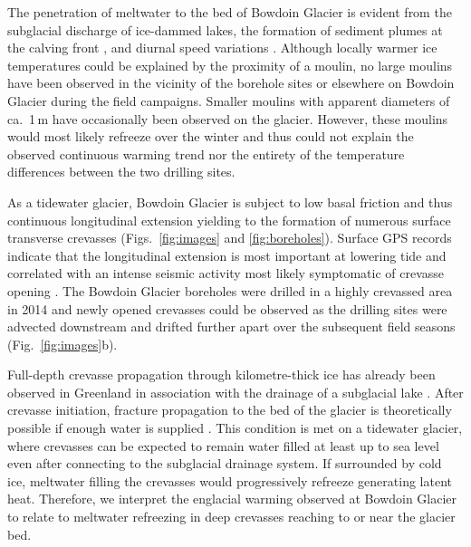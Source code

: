 \documentclass[utf8]{article}
\begin{document}
    The penetration of meltwater to the bed of Bowdoin Glacier is evident from
    the subglacial discharge of ice-dammed lakes, the formation of sediment
    plumes at the calving front \citep{Jouvet.etal.2018, Kanna.etal.2018}, and
    diurnal speed variations \citep{Sugiyama.etal.2014, Podolskiy.etal.2016}.
    Although locally warmer ice temperatures could be explained by the
    proximity of a moulin, no large moulins have been observed in the vicinity
    of the borehole sites or elsewhere on Bowdoin Glacier during the field
    campaigns. Smaller moulins with apparent diameters of ca.~1\,m have
    occasionally been observed on the glacier. However, these moulins would
    most likely refreeze over the winter and thus could not explain the
    observed continuous warming trend nor the entirety of the temperature
    differences between the two drilling sites.

    As a tidewater glacier, Bowdoin Glacier is subject to low basal friction
    \citep{Seddik.etal.2019} and
    thus continuous longitudinal extension yielding to the formation of
    numerous surface transverse crevasses (Figs.~\ref{fig:images} and
    \ref{fig:boreholes}). Surface GPS records indicate that the longitudinal
    extension is most important at lowering tide and correlated with an intense
    seismic activity most likely symptomatic of crevasse opening
    \citep{Podolskiy.etal.2016, Podolskiy.etal.2017}.
    The Bowdoin Glacier boreholes were drilled in a highly crevassed area in
    2014 and newly opened crevasses could be observed as the drilling sites
    were
    advected downstream and drifted further apart over the subsequent field
    seasons (Fig.~\ref{fig:images}b).

    Full-depth crevasse propagation through kilometre-thick ice has already
    been observed in Greenland in association with the drainage of a subglacial
    lake \citep{Das.etal.2008}. After crevasse initiation, fracture propagation
    to the bed of the glacier is theoretically possible if enough water is
    supplied \citep{Veen.2007}. This condition is met on a tidewater glacier,
    where crevasses can be expected to remain water filled at least up to sea
    level even after connecting to the subglacial drainage system. If
    surrounded by cold ice, meltwater filling the crevasses would progressively
    refreeze generating latent heat. Therefore, we interpret the englacial
    warming observed at Bowdoin Glacier to relate to meltwater refreezing in
    deep crevasses reaching to or near the glacier bed.
\end{document}
